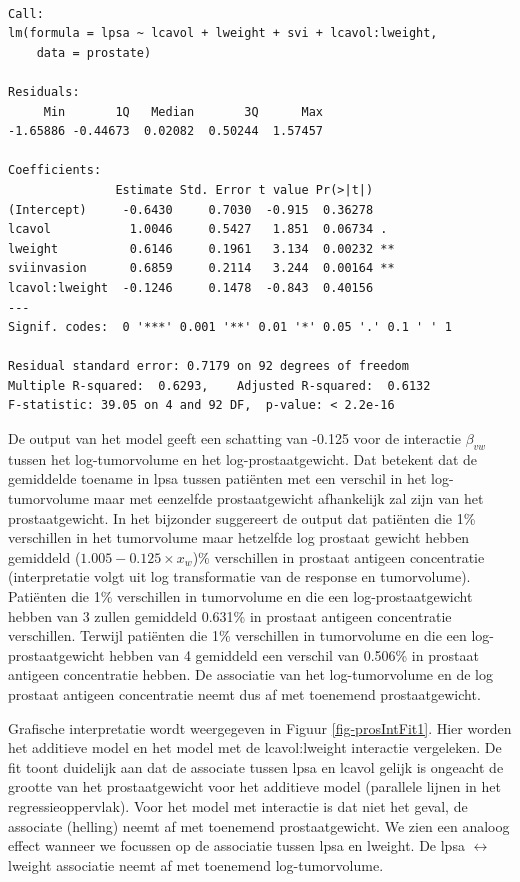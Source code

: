 \documentclass[
  dutch,
  letterpaper,
  12pt]{book}
\theoremstyle{definition}
\theoremstyle{definition}
\theoremstyle{definition}
\theoremstyle{remark}
\begin{document}
\begin{verbatim}

Call:
lm(formula = lpsa ~ lcavol + lweight + svi + lcavol:lweight, 
    data = prostate)

Residuals:
     Min       1Q   Median       3Q      Max 
-1.65886 -0.44673  0.02082  0.50244  1.57457 

Coefficients:
               Estimate Std. Error t value Pr(>|t|)   
(Intercept)     -0.6430     0.7030  -0.915  0.36278   
lcavol           1.0046     0.5427   1.851  0.06734 . 
lweight          0.6146     0.1961   3.134  0.00232 **
sviinvasion      0.6859     0.2114   3.244  0.00164 **
lcavol:lweight  -0.1246     0.1478  -0.843  0.40156   
---
Signif. codes:  0 '***' 0.001 '**' 0.01 '*' 0.05 '.' 0.1 ' ' 1

Residual standard error: 0.7179 on 92 degrees of freedom
Multiple R-squared:  0.6293,    Adjusted R-squared:  0.6132 
F-statistic: 39.05 on 4 and 92 DF,  p-value: < 2.2e-16
\end{verbatim}

De output van het model geeft een schatting van -0.125 voor de
interactie \(\beta_{vw}\) tussen het log-tumorvolume en het
log-prostaatgewicht. Dat betekent dat de gemiddelde toename in lpsa
tussen patiënten met een verschil in het log-tumorvolume maar met
eenzelfde prostaatgewicht afhankelijk zal zijn van het prostaatgewicht.
In het bijzonder suggereert de output dat patiënten die 1\% verschillen
in het tumorvolume maar hetzelfde log prostaat gewicht hebben gemiddeld
(\(1.005-0.125 \times x_w\))\% verschillen in prostaat antigeen
concentratie (interpretatie volgt uit log transformatie van de response
en tumorvolume). Patiënten die 1\% verschillen in tumorvolume en die een
log-prostaatgewicht hebben van 3 zullen gemiddeld 0.631\% in prostaat
antigeen concentratie verschillen. Terwijl patiënten die 1\% verschillen
in tumorvolume en die een log-prostaatgewicht hebben van 4 gemiddeld een
verschil van 0.506\% in prostaat antigeen concentratie hebben. De
associatie van het log-tumorvolume en de log prostaat antigeen
concentratie neemt dus af met toenemend prostaatgewicht.

Grafische interpretatie wordt weergegeven in Figuur
\ref{fig-prosIntFit1}. Hier worden het additieve model en het model met
de lcavol:lweight interactie vergeleken. De fit toont duidelijk aan dat
de associate tussen lpsa en lcavol gelijk is ongeacht de grootte van het
prostaatgewicht voor het additieve model (parallele lijnen in het
regressieoppervlak). Voor het model met interactie is dat niet het
geval, de associate (helling) neemt af met toenemend prostaatgewicht. We
zien een analoog effect wanneer we focussen op de associatie tussen lpsa
en lweight. De lpsa \(\leftrightarrow\) lweight associatie neemt af met
toenemend log-tumorvolume.
\end{document}
